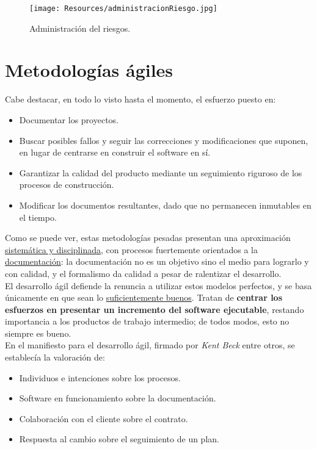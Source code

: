 \begin{figure}[H]
   \centering
   \texttt{[image: Resources/administracionRiesgo.jpg]}
   \caption{Administración del riesgos.}
   \label{fig:administracionRiesgo}
\end{figure}





\section{Metodologías ágiles}

Cabe destacar, en todo lo visto hasta el momento, el esfuerzo puesto en:

\begin{itemize}
   \item Documentar los proyectos.
   \item Buscar posibles fallos y seguir las correcciones y modificaciones que suponen, en lugar de centrarse en construir el software en sí.
   \item Garantizar la calidad del producto mediante un seguimiento riguroso de los procesos de construcción.
   \item Modificar los documentos resultantes, dado que no permanecen inmutables en el tiempo.
\end{itemize}

Como se puede ver, estas metodologías pesadas presentan una aproximación \uline{sistemática y disciplinada}, con procesos fuertemente orientados a la \uline{documentación}: la documentación no es un objetivo sino el medio para lograrlo y con calidad, y el formalismo da calidad a pesar de ralentizar el desarrollo.\\

El desarrollo ágil defiende la renuncia a utilizar estos modelos perfectos, y se basa únicamente en que sean lo \uline{suficientemente buenos}. Tratan de \textbf{centrar los esfuerzos en presentar un incremento del software ejecutable}, restando importancia a los productos de trabajo intermedio; de todos modos, esto no siempre es bueno.\\

En el manifiesto para el desarrollo ágil, firmado por \textit{Kent Beck} entre otros, se establecía la valoración de:

\begin{itemize}
   \item Individuos e intenciones sobre los procesos.
   \item Software en funcionamiento sobre la documentación.
   \item Colaboración con el cliente sobre el contrato.
   \item Respuesta al cambio sobre el seguimiento de un plan.
\end{itemize}

